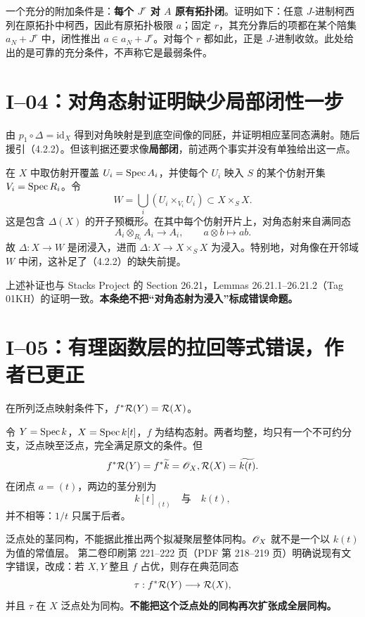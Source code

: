 一个充分的附加条件是：\textbf{每个 $J^r$ 对 $A$ 原有拓扑闭}。证明如下：任意 $J$-进制柯西列在原拓扑中柯西，因此有原拓扑极限 $a$；固定 $r$，其充分靠后的项都在某个陪集 $a_N+J^r$ 中，闭性推出 $a\in a_N+J^r$。对每个 $r$ 都如此，正是 $J$-进制收敛。此处给出的是可靠的充分条件，不声称它是最弱条件。

\section{I--04：对角态射证明缺少局部闭性一步}
由 $p_1\circ\Delta=\mathrm{id}_X$ 得到对角映射是到底空间像的同胚，并证明相应茎同态满射。随后援引（4.2.2）。但该判据还要求像\textbf{局部闭}，前述两个事实并没有单独给出这一点。
\begin{analysisproof}
在 $X$ 中取仿射开覆盖 $U_i=\operatorname{Spec} A_i$，并使每个 $U_i$ 映入 $S$ 的某个仿射开集 $V_i=\operatorname{Spec} R_i$。令
\[
W=\bigcup_i(U_i\times_{V_i}U_i)\subset X\times_S X.
\]
这是包含 $\Delta(X)$ 的开子预概形。在其中每个仿射开片上，对角态射来自满同态
\[
A_i\otimes_{R_i}A_i\longrightarrow A_i,
\qquad a\otimes b\longmapsto ab.
\]
故 $\Delta:X\to W$ 是闭浸入，进而 $\Delta:X\to X\times_SX$ 为浸入。特别地，对角像在开邻域 $W$ 中闭，这补足了（4.2.2）的缺失前提。
\end{analysisproof}
上述补证也与 Stacks Project 的 Section 26.21，Lemmas 26.21.1--26.21.2（Tag 01KH）的证明一致。\textbf{本条绝不把“对角态射为浸入”标成错误命题。}

\section{I--05：有理函数层的拉回等式错误，作者已更正}
在所列泛点映射条件下，$f^*\mathcal R(Y)=\mathcal R(X)$。
\begin{analysisproof}
令 $Y=\operatorname{Spec} k$，$X=\operatorname{Spec} k[t]$，$f$ 为结构态射。两者均整，均只有一个不可约分支，泛点映至泛点，完全满足原文的条件。但
\[
f^*\mathcal R(Y)=f^*\widetilde{k}=\mathscr O_X,
 \mathcal R(X)=\widetilde{k(t)}.
\]
在闭点 $a=(t)$，两边的茎分别为
\[
k[t]_{(t)}\quad\text{与}\quad k(t),
\]
并不相等：$1/t$ 只属于后者。
\end{analysisproof}
泛点处的茎同构，不能据此推出两个拟凝聚层整体同构。$\mathscr O_X$ 就不是一个以 $k(t)$ 为值的常值层。
第二卷印刷第 221--222 页（PDF 第 218--219 页）明确说现有文字错误，改成：若 $X,Y$ 整且 $f$ 占优，则存在典范同态
\[
\tau:f^*\mathcal R(Y)\longrightarrow\mathcal R(X),
\]
并且 $\tau$ 在 $X$ 泛点处为同构。\textbf{不能把这个泛点处的同构再次扩张成全层同构。}

